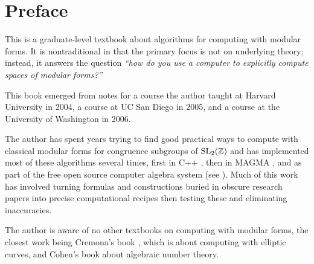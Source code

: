 %

\chapter*{Preface}


This is a graduate-level textbook about algorithms for computing with
modular forms.  It is nontraditional in that the primary focus is not
on underlying theory; instead, it answers the question {\em ``how do you use a
computer to explicitly compute spaces of modular forms?''}

This book emerged from notes for a course the author
taught at Harvard University in 2004, a course
at UC San Diego in 2005, and a course at
the University of Washington in 2006. 

The author has spent years trying to find good practical ways to
compute with classical modular forms for congruence subgroups of
$\operatorname{SL}_2(\mathbb{Z})$ and has implemented most of these algorithms several
times, first in C++ \cite{stein:hecke}, then in MAGMA \cite{magma},
and as part of the free open source computer
algebra system \sage{} (see \cite{sage}).  Much of this work has involved
turning formulas and constructions buried in obscure research papers
into precise computational recipes then testing these 
and eliminating inaccuracies.

The author is aware of no other textbooks on computing with modular
forms, the closest work being Cremona's book \cite{cremona:algs},
which is about computing with elliptic curves, and Cohen's book
\cite{cohen:course_ant} about algebraic number theory.  

